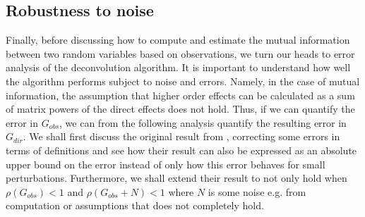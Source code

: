 \documentclass[../Thesis.tex]{subfiles}
\begin{document}
\subsection{Robustness to noise}\label{subseq:Robustness to noise}
Finally, before discussing how to compute and estimate the mutual information between two random variables based on observations, we turn our heads to error analysis of the deconvolution algorithm. It is important to understand how well the algorithm performs subject to noise and errors. Namely, in the case of mutual information, the assumption that higher order effects can be calculated as a sum of matrix powers of the direct effects does not hold. Thus, if we can quantify the error in $G_{obs}$, we can from the following analysis quantify the resulting error in $G_{dir}$. We shall first discuss the original result from \cite{Network-deconvolution-as-a-general-method-to-distinguish-direct-dependencies-in-networks}, correcting some errors in terms of definitions and see how their result can also be expressed as an absolute upper bound on the error instead of only how this error behaves for small perturbations. Furthermore, we shall extend their result to not only hold when $\rho\left(G_{obs}\right) < 1$ and $\rho\left(G_{obs} + N\right) < 1$ where $N$ is some noise e.g. from computation or assumptions that does not completely hold.

\end{document}
